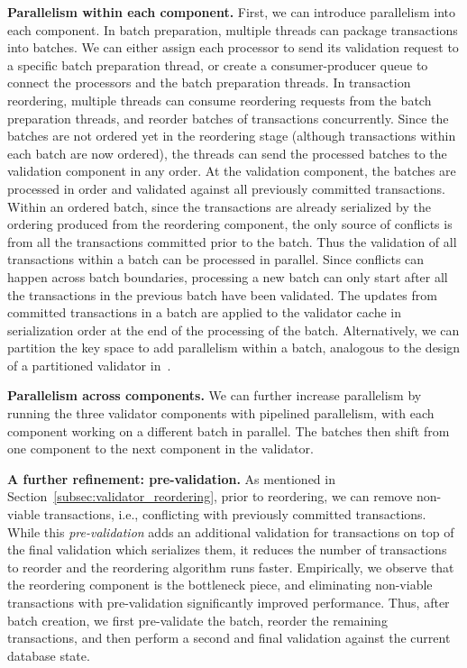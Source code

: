 {\bf Parallelism within each component.}
First, we can introduce parallelism into each component. In batch preparation, multiple threads can package transactions into batches. We can either assign each processor to send its validation request to a specific batch preparation thread, or create a consumer-producer queue to connect the processors and the batch preparation threads. In transaction reordering, multiple threads can consume reordering requests from the batch preparation threads, and reorder batches of transactions concurrently. Since the batches are not ordered yet in the reordering stage (although transactions within each batch are now ordered), the threads can send the processed batches to the validation component in any order. At the validation component, the batches are processed in order and validated against all previously committed transactions. 
Within an ordered batch, since the transactions are already serialized by the ordering produced from the reordering component, the only source of conflicts is from all the transactions committed prior to the batch. Thus the validation of all transactions within a batch can be processed in parallel. Since conflicts can happen across batch boundaries, processing a new batch can only start after all the transactions in the previous batch have been validated. The updates from committed transactions in a batch are applied to the validator cache in serialization order at the end of the processing of the batch. Alternatively, we can partition the key space to add parallelism within a batch, analogous to the design of a partitioned validator in~\cite{ding2015centiman}.


{\bf Parallelism across components.}
We can further increase parallelism by running the three validator components with pipelined parallelism, 
with each component working on a different batch in parallel. The batches then shift from one component to the next component in the validator.

{\bf A further refinement: pre-validation.} As mentioned in Section~\ref{subsec:validator_reordering}, prior to reordering, we can remove non-viable transactions, i.e., conflicting with previously committed transactions. While this \emph{pre-validation} adds an additional validation for transactions on top of the final validation which serializes them, it reduces the number of transactions to reorder and the reordering algorithm runs faster. Empirically, we observe that the reordering component is the bottleneck piece, and eliminating non-viable transactions with pre-validation significantly improved performance. Thus, after batch creation, we first pre-validate the batch, reorder the remaining transactions, and then perform a second and final validation against the current database state.

